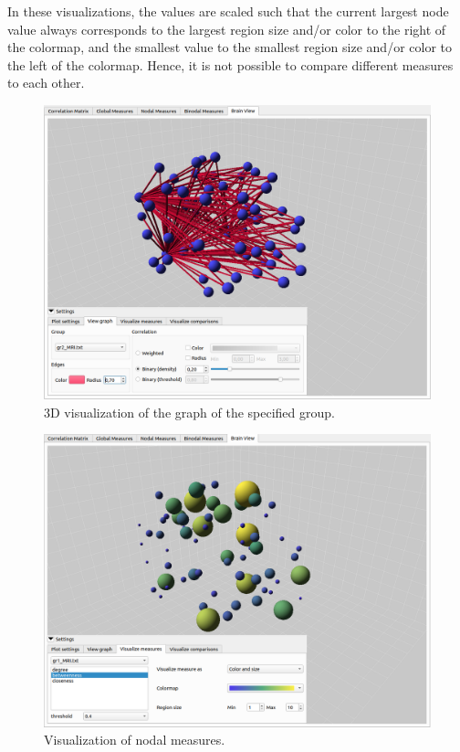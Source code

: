 \documentclass{article}
\begin{document}
In these visualizations, the values are scaled such that the current largest node value always corresponds to the largest region size and/or color to the right of the colormap, and the smallest value to the smallest region size and/or color to the left of the colormap. Hence, it is not possible to compare different measures to each other.

\begin{figure}[h]
    \centering
    \includegraphics[width=\linewidth]{graph_vis.png}
    \caption{3D visualization of the graph of the specified group.}
    \label{fig:graph_vis}
\end{figure}

\begin{figure}[h]
    \centering
    \includegraphics[width=\linewidth]{measure_vis.png}
    \caption{Visualization of nodal measures.}
    \label{fig:measure_vis}
\end{figure}
\end{document}

